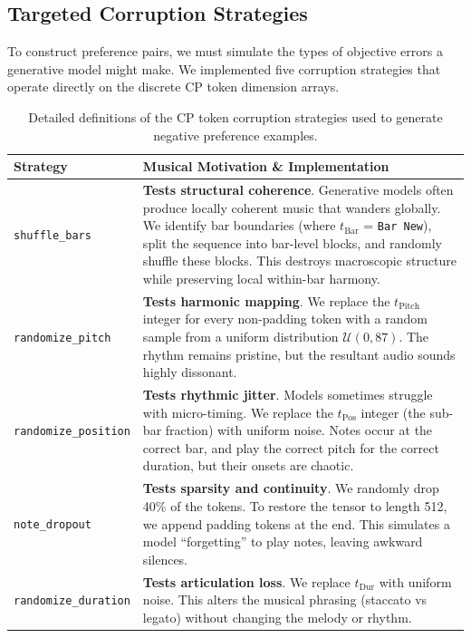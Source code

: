 \documentclass[11pt,a4paper]{article}
\begin{document}
\subsection{Targeted Corruption Strategies}

To construct preference pairs, we must simulate the types of objective errors a generative model might make. We implemented five corruption strategies that operate directly on the discrete CP token dimension arrays.

\begin{table}[h]
\centering
\caption{Detailed definitions of the CP token corruption strategies used to generate negative preference examples.}
\label{tab:corruption}
\begin{tabular}{@{}p{3.5cm}p{11.5cm}@{}}
\toprule
\textbf{Strategy} & \textbf{Musical Motivation \& Implementation} \\
\midrule
\texttt{shuffle\_bars} & \textbf{Tests structural coherence}. Generative models often produce locally coherent music that wanders globally. We identify bar boundaries (where $t_{\text{Bar}}$ = \texttt{Bar New}), split the sequence into bar-level blocks, and randomly shuffle these blocks. This destroys macroscopic structure while preserving local within-bar harmony. \\
\addlinespace
\texttt{randomize\_pitch} & \textbf{Tests harmonic mapping}. We replace the $t_{\text{Pitch}}$ integer for every non-padding token with a random sample from a uniform distribution $\mathcal{U}(0, 87)$. The rhythm remains pristine, but the resultant audio sounds highly dissonant. \\
\addlinespace
\texttt{randomize\_position} & \textbf{Tests rhythmic jitter}. Models sometimes struggle with micro-timing. We replace the $t_{\text{Pos}}$ integer (the sub-bar fraction) with uniform noise. Notes occur at the correct bar, and play the correct pitch for the correct duration, but their onsets are chaotic. \\
\addlinespace
\texttt{note\_dropout} & \textbf{Tests sparsity and continuity}. We randomly drop 40\% of the tokens. To restore the tensor to length 512, we append padding tokens at the end. This simulates a model ``forgetting'' to play notes, leaving awkward silences. \\
\addlinespace
\texttt{randomize\_duration} & \textbf{Tests articulation loss}. We replace $t_{\text{Dur}}$ with uniform noise. This alters the musical phrasing (staccato vs legato) without changing the melody or rhythm. \\
\bottomrule
\end{tabular}
\end{table}
\end{document}
